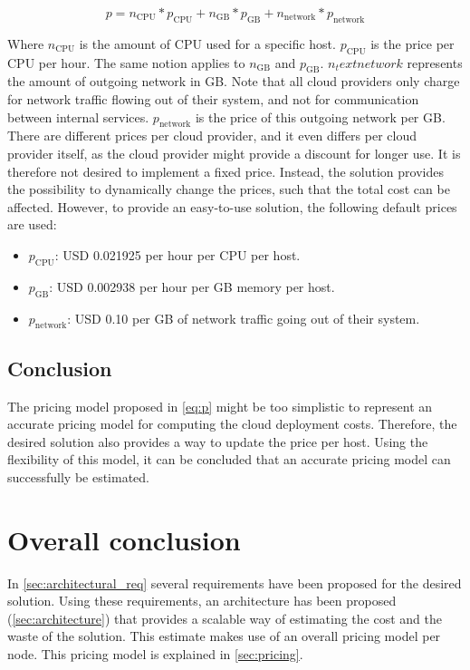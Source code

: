 \begin{equation} \label{eq:p}
p =  n_\text{CPU} * p_\text{CPU} + n_\text{GB} * p_\text{GB} + n_\text{network} * p_\text{network}
\end{equation}

\noindent
Where $n_\text{CPU}$ is the amount of CPU used for a specific host. $p_\text{CPU}$ is the price per CPU per hour. The same notion applies to $n_\text{GB}$ and $p_\text{GB}$. $n_text{network}$ represents the amount of outgoing network in GB. Note that all cloud providers only charge for network traffic flowing out of their system, and not for communication between internal services. $p_\text{network}$ is the price of this outgoing network per GB.\\

\noindent 
There are different prices per cloud provider, and it even differs per cloud provider itself, as the cloud provider might provide a discount for longer use. It is therefore not desired to implement a fixed price. Instead, the solution provides the possibility to dynamically change the prices, such that the total cost can be affected. However, to provide an easy-to-use solution, the following default prices are used:
\begin{itemize}
    \item $p_\text{CPU}$: USD 0.021925 per hour per CPU per host.
    \item $p_\text{GB}$: USD 0.002938 per hour per GB memory per host.
    \item $p_\text{network}$: USD 0.10 per GB of network traffic going out of their system.
\end{itemize}

\subsection{Conclusion}
The pricing model proposed in \autoref{eq:p} might be too simplistic to represent an accurate pricing model for computing the cloud deployment costs. Therefore, the desired solution also provides a way to update the price per host. Using the flexibility of this model, it can be concluded that an accurate pricing model can successfully be estimated.


\section{Overall conclusion}
In \autoref{sec:architectural_req} several requirements have been proposed for the desired solution. Using these requirements, an architecture has been proposed (\autoref{sec:architecture}) that provides a scalable way of estimating the cost and the waste of the solution. This estimate makes use of an overall pricing model per node. This pricing model is explained in \autoref{sec:pricing}.